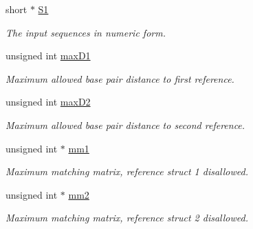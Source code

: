 \begin{DoxyCompactItemize}
short $\ast$ \mbox{\hyperlink{group__kl__neighborhood__mfe_ab9ee459ffbfb5d2c138a033516056cdc}{S1}}
\begin{DoxyCompactList}\small\item\em The input sequences in numeric form. \end{DoxyCompactList}\item 
\mbox{\label{group__kl__neighborhood__mfe_a621ed2ab02116f3f8f5e7120dec429eb}} 
unsigned int \mbox{\hyperlink{group__kl__neighborhood__mfe_a621ed2ab02116f3f8f5e7120dec429eb}{max\+D1}}
\begin{DoxyCompactList}\small\item\em Maximum allowed base pair distance to first reference. \end{DoxyCompactList}\item 
\mbox{\label{group__kl__neighborhood__mfe_a03f198a4abdb3b784486d2ba5c533aa4}} 
unsigned int \mbox{\hyperlink{group__kl__neighborhood__mfe_a03f198a4abdb3b784486d2ba5c533aa4}{max\+D2}}
\begin{DoxyCompactList}\small\item\em Maximum allowed base pair distance to second reference. \end{DoxyCompactList}\item 
\mbox{\label{group__kl__neighborhood__mfe_aa11f5bcd8c4fe70a91c155c877c855d5}} 
unsigned int $\ast$ \mbox{\hyperlink{group__kl__neighborhood__mfe_aa11f5bcd8c4fe70a91c155c877c855d5}{mm1}}
\begin{DoxyCompactList}\small\item\em Maximum matching matrix, reference struct 1 disallowed. \end{DoxyCompactList}\item 
\mbox{\label{group__kl__neighborhood__mfe_a2eaa93316b6beb17531f0c078806036c}} 
unsigned int $\ast$ \mbox{\hyperlink{group__kl__neighborhood__mfe_a2eaa93316b6beb17531f0c078806036c}{mm2}}
\begin{DoxyCompactList}\small\item\em Maximum matching matrix, reference struct 2 disallowed. \end{DoxyCompactList}\item 
\mbox{\label{group__kl__neighborhood__mfe_a1a20cb06b58b75d1a3dbdbc8bc60d0a7}} 

\end{DoxyCompactItemize}

